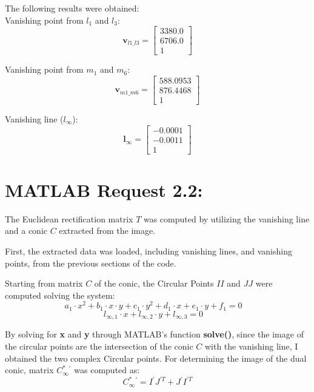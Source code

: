\documentclass{Configuration_Files/PoliMi3i_thesis}
\begin{document}
The following results were obtained:\\
Vanishing point from \( l_1 \) and \( l_3 \):
\[
\mathbf{v}_{l1\_l3} = \begin{bmatrix}
3380.0 \\
6706.0 \\
1
\end{bmatrix}
\]

Vanishing point from \( m_1 \) and \( m_6 \):
\[
\mathbf{v}_{m1\_m6} = \begin{bmatrix}
588.0953 \\
876.4468 \\
1
\end{bmatrix}
\]

Vanishing line (\( l_{\infty} \)):
\[
\mathbf{l}_{\infty} = \begin{bmatrix}
-0.0001 \\
-0.0011 \\
1
\end{bmatrix}
\]




\newpage
\section{MATLAB Request 2.2: }

The Euclidean rectification matrix \( T \) was computed by utilizing the vanishing line and a conic \( C \) extracted from the image. 

First, the extracted data was loaded, including vanishing lines, and vanishing points, from the previous sections of the code. 

Starting from matrix \( C \) of the conic, the Circular Points \( II \) and \( JJ \) were computed solving the system:
\[
a_{1} \cdot x^{2} + b_{1} \cdot x \cdot y + c_{1} \cdot y^{2} + d_{1} \cdot x + e_{1} \cdot y + f_{1} = 0 \quad 
\]
\[
l_{\infty,1} \cdot x + l_{\infty,2} \cdot y + l_{\infty,3} = 0 \quad 
\]

By solving for \textbf{x} and \textbf{y} through MATLAB's function \textbf{solve()}, since the image of the circular points are the intersection of the conic \( C \) with the vanishing line, I obtained the two complex Circular points.
For determining the image of the dual conic, matrix \(C^{*}_{\infty}{}^{\prime}\) was computed as:
\[
C^{*}_{\infty}{}^{\prime} = I^{\prime}J^{\prime T} + J^{\prime}I^{\prime T}
\]
\end{document}
